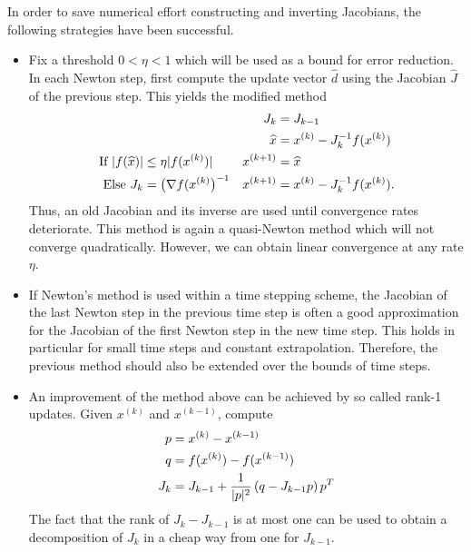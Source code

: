 \begin{remark}
  In order to save numerical effort constructing and inverting
  Jacobians, the following strategies have been successful.
  \begin{itemize}
  \item Fix a threshold $0<\eta<1$ which will be used as a bound for
    error reduction. In each Newton step, first compute the update
    vector $\widehat d$ using the Jacobian $\widehat J$ of the
    previous step. This yields the modified method
    \begin{gather}
      \label{eq:newton:1}
      \begin{alignedat}2
        &&J_k &= J_{k-1} \\
        &&\widehat x &= x^{(k)} - J_{k}^{-1}f(x^{(k)})\\
        \text{If }\abs{f(\widehat x)} &\le \eta
          \abs{f(x^{(k)})} \quad& x^{(k+1)} &= \widehat x\\
          \text{Else } J_k &= \bigl(\nabla f(x^{(k)}\bigr)^{-1}
          \quad & x^{(k+1)} &=x^{(k)}- J_{k}^{-1}f(x^{(k)}). 
      \end{alignedat}
    \end{gather}
    Thus, an old Jacobian and its inverse are used until convergence
    rates deteriorate. This method is again a quasi-Newton method
    which will not converge quadratically. However, we can obtain linear
    convergence at any rate $\eta$.
  \item If Newton's method is used within a time stepping scheme, the
    Jacobian of the last Newton step in the previous time step is
    often a good approximation for the Jacobian of the first Newton
    step in the new time step. This holds in particular for small time
    steps and constant extrapolation. Therefore, the previous method
    should also be extended over the bounds of time steps.
  \item An improvement of the method above can be achieved by so
    called rank-1 updates. Given $x^{(k)}$ and $x^{(k-1)}$, compute
    \begin{gather}
      \label{eq:newton:2}
      \begin{split}
        p &= x^{(k)} - x^{(k-1)}\\
        q &= f(x^{(k)}) - f(x^{(k-1)})\\
        J_k &= J_{k-1} + \frac1{\lvert p\rvert^2}
        \left(q - J_{k-1} p\right)p^T
      \end{split}
    \end{gather}
    The fact that the rank of $J_k - J_{k-1}$ is at most one can be
    used to obtain a decomposition of $J_k$ in a cheap way from one
    for $J_{k-1}$.
  \end{itemize}
\end{remark}

